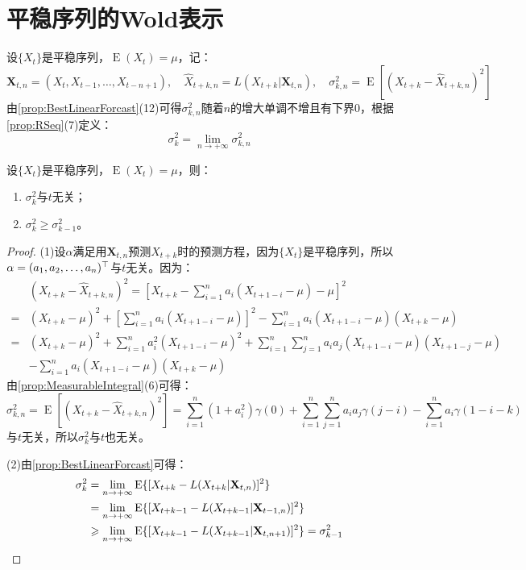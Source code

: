 \section{平稳序列的Wold表示}
\begin{definition}
	设$\{X_t\}$是平稳序列，$\operatorname{E}(X_t)=\mu$，记：
	\begin{equation*}
		\mathbf{X}_{t,n}=(X_t,X_{t-1},\dots,X_{t-n+1}),\quad\hat{X}_{t+k,n}=L(X_{t+k}|\mathbf{X}_{t,n}),\quad\sigma_{k,n}^2=\operatorname{E}[(X_{t+k}-\hat{X}_{t+k,n})^2]
	\end{equation*}
	由\cref{prop:BestLinearForcast}(12)可得$\sigma_{k,n}^2$随着$n$的增大单调不增且有下界$0$，根据\cref{prop:RSeq}(7)定义：
	\begin{equation*}
		\sigma_k^2=\lim_{n\to+\infty}\sigma_{k,n}^2
	\end{equation*}
\end{definition}
\begin{property}
	设$\{X_t\}$是平稳序列，$\operatorname{E}(X_t)=\mu$，则：
	\begin{enumerate}
		\item $\sigma_k^2$与$t$无关；
		\item $\sigma_k^2\geqslant\sigma_{k-1}^2$。
	\end{enumerate}
\end{property}
\begin{proof}
	(1)设$\alpha$满足用$\mathbf{X}_{t,n}$预测$X_{t+k}$时的预测方程，因为$\{X_t\}$是平稳序列，所以$\alpha=(a_1, a_2, \dots, a_{n})^{\top}$与$t$无关。因为：
	\begin{align*}
		&(X_{t+k}-\hat{X}_{t+k,n})^2=\left[X_{t+k}-\sum_{i=1}^{n}a_i(X_{t+1-i}-\mu)-\mu\right]^2 \\
		=&(X_{t+k}-\mu)^2+\left[\sum_{i=1}^{n}a_i(X_{t+1-i}-\mu)\right]^2-\sum_{i=1}^{n}a_i(X_{t+1-i}-\mu)(X_{t+k}-\mu) \\
		=&(X_{t+k}-\mu)^2+\sum_{i=1}^{n}a_i^2(X_{t+1-i}-\mu)^2+\sum_{i=1}^{n}\sum_{j=1}^{n}a_ia_j(X_{t+1-i}-\mu)(X_{t+1-j}-\mu) \\
		&-\sum_{i=1}^{n}a_i(X_{t+1-i}-\mu)(X_{t+k}-\mu)
	\end{align*}
	由\cref{prop:MeasurableIntegral}(6)可得：
	\begin{equation*}
		\sigma_{k,n}^2=\operatorname{E}[(X_{t+k}-\hat{X}_{t+k,n})^2]=\sum_{i=1}^{n}(1+a_i^2)\gamma(0)+\sum_{i=1}^{n}\sum_{j=1}^{n}a_ia_j\gamma(j-i)-\sum_{i=1}^{n}a_i\gamma(1-i-k)
	\end{equation*}
	与$t$无关，所以$\sigma_k^2$与$t$也无关。\par
	(2)由\cref{prop:BestLinearForcast}可得：
	\begin{align*}
		\sigma_k^2&=\lim_{n\to+\infty}\operatorname{E}\{[X_{t+k}-L(X_{t+k}|\mathbf{X}_{t,n})]^2\} \\
		&=\lim_{n\to+\infty}\operatorname{E}\{[X_{t+k-1}-L(X_{t+k-1}|\mathbf{X}_{t-1,n})]^2\} \\
		&\geqslant\lim_{n\to+\infty}\operatorname{E}\{[X_{t+k-1}-L(X_{t+k-1}|\mathbf{X}_{t,n+1})]^2\}=\sigma_{k-1}^2\qedhere
	\end{align*}
\end{proof}
